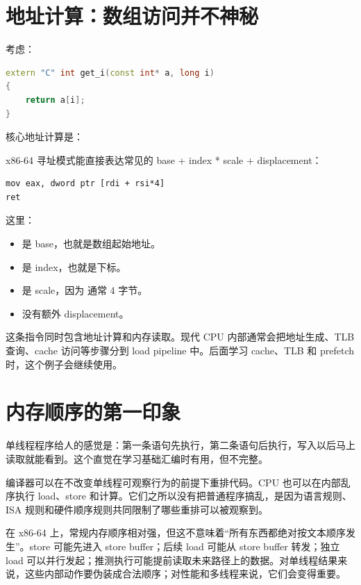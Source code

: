 \section{地址计算：数组访问并不神秘}

考虑：

\begin{lstlisting}[language=C++]
extern "C" int get_i(const int* a, long i)
{
    return a[i];
}
\end{lstlisting}

核心地址计算是：

\begin{center}
\end{center}

x86-64 寻址模式能直接表达常见的 base + index * scale + displacement：

\begin{lstlisting}
mov eax, dword ptr [rdi + rsi*4]
ret
\end{lstlisting}

这里：

\begin{itemize}
  \item {} 是 base，也就是数组起始地址。
  \item {} 是 index，也就是下标。
  \item {} 是 scale，因为  通常 4 字节。
  \item 没有额外 displacement。
\end{itemize}

这条指令同时包含地址计算和内存读取。现代 CPU 内部通常会把地址生成、TLB 查询、cache 访问等步骤分到 load pipeline 中。后面学习 cache、TLB 和 prefetch 时，这个例子会继续使用。

\section{内存顺序的第一印象}

单线程程序给人的感觉是：第一条语句先执行，第二条语句后执行，写入以后马上读取就能看到。这个直觉在学习基础汇编时有用，但不完整。

编译器可以在不改变单线程可观察行为的前提下重排代码。CPU 也可以在内部乱序执行 load、store 和计算。它们之所以没有把普通程序搞乱，是因为语言规则、ISA 规则和硬件顺序规则共同限制了哪些重排可以被观察到。

在 x86-64 上，常规内存顺序相对强，但这不意味着“所有东西都绝对按文本顺序发生”。store 可能先进入 store buffer；后续 load 可能从 store buffer 转发；独立 load 可以并行发起；推测执行可能提前读取未来路径上的数据。对单线程结果来说，这些内部动作要伪装成合法顺序；对性能和多线程来说，它们会变得重要。

